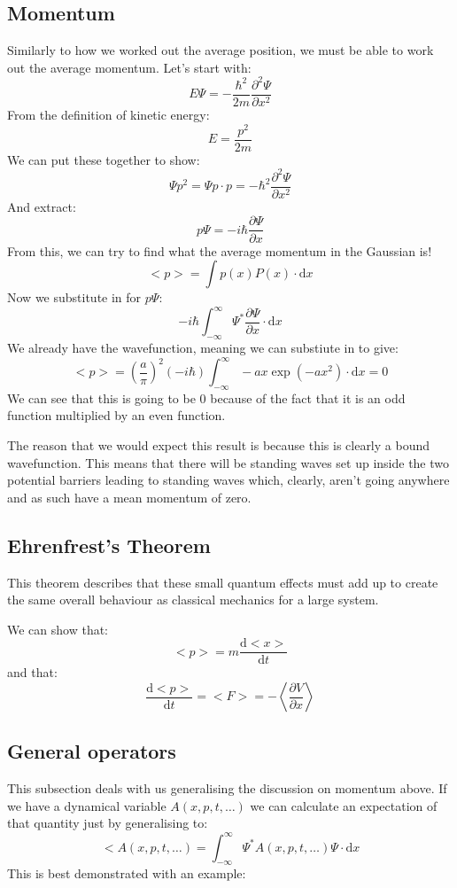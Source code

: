 \subsection{Momentum}
Similarly to how we worked out the average position, we must be able to work out
the average momentum. Let's start with:
$$
	E\Psi = - \frac{\hbar^2}{2m}\frac{\partial^2 \Psi}{\partial x^2}
$$
From the definition of kinetic energy:
$$
	E= \frac{p^2}{2m}
$$
We can put these together to show:
$$
	\Psi p^2 = \Psi p \cdot p = -\hbar^2 \frac{\partial^2 \Psi}{\partial x^2}
$$
And extract:
$$
	p\Psi = -i\hbar\frac{\partial\Psi}{\partial x}
$$
From this, we can try to find what the average momentum in the Gaussian is!
$$
	<p> = \int p(x) P(x) \cdot \mathrm{d} x
$$
Now we substitute in for $p\Psi$:
$$
	-i\hbar \int^\infty_{-\infty} \Psi^* \frac{\partial \Psi}{\partial x}
	\cdot \mathrm{d} x
$$
We already have the wavefunction, meaning we can substiute in to give:
$$
	<p> = {\left(\frac{a}{\pi}\right)}^2 (-i\hbar)
	\int^\infty_{-\infty} -ax\exp(-ax^2) \cdot \mathrm{d} x = 0
$$
We can see that this is going to be 0 because of the fact that it is an odd
function multiplied by an even function.

The reason that we would expect this result is because this is clearly a bound
wavefunction. This means that there will be standing waves set up inside the
two potential barriers leading to standing waves which, clearly, aren't going
anywhere and as such have a mean momentum of zero.

\subsection{Ehrenfrest's Theorem}

This theorem describes that these small quantum effects must add up to create
the same overall behaviour as classical mechanics for a large system.

We can show that:
$$
	<p> = m \frac{\mathrm{d}<x>}{\mathrm{d}t}
$$
and that:
$$
	\frac{\mathrm{d}<p>}{\mathrm{d}t} = <F> =
	-\left<\frac{\partial V}{\partial x}\right>
$$

\subsection{General operators}
This subsection deals with us generalising the discussion on momentum above. If
we have a dynamical variable $A(x,p,t,\hdots)$ we can calculate an expectation
of that quantity just by generalising to:
$$
	<A(x,p,t,\hdots) = \int^\infty_{-\infty} \Psi^* A(x,p,t,\hdots)\Psi
	\cdot \mathrm{d}x
$$
This is best demonstrated with an example:

